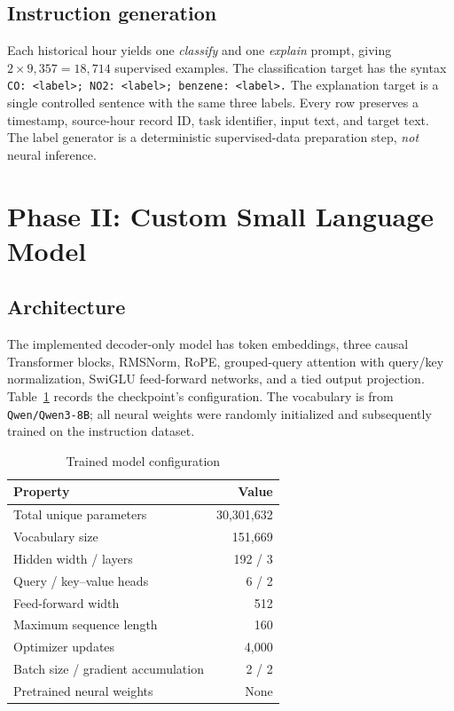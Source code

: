 \documentclass[conference,a4paper,10pt]{IEEEtran}
\begin{document}
\subsection{Instruction generation}
Each historical hour yields one \emph{classify} and one \emph{explain} prompt, giving $2\times9{,}357=18{,}714$ supervised examples. The classification target has the syntax \texttt{CO: <label>; NO2: <label>; benzene: <label>.} The explanation target is a single controlled sentence with the same three labels. Every row preserves a timestamp, source-hour record ID, task identifier, input text, and target text. The label generator is a deterministic supervised-data preparation step, \emph{not} neural inference.

\section{Phase II: Custom Small Language Model}
\subsection{Architecture}
The implemented decoder-only model has token embeddings, three causal Transformer blocks, RMSNorm, RoPE, grouped-query attention with query/key normalization, SwiGLU feed-forward networks, and a tied output projection. Table~\ref{tab:model} records the checkpoint's configuration. The vocabulary is from \texttt{Qwen/Qwen3-8B}; all neural weights were randomly initialized and subsequently trained on the instruction dataset.

\begin{table}[t]
\centering
\caption{Trained model configuration}
\label{tab:model}
\begin{tabular}{lr}
\toprule
Property & Value\\
\midrule
Total unique parameters & 30,301,632\\
Vocabulary size & 151,669\\
Hidden width / layers & 192 / 3\\
Query / key--value heads & 6 / 2\\
Feed-forward width & 512\\
Maximum sequence length & 160\\
Optimizer updates & 4,000\\
Batch size / gradient accumulation & 2 / 2\\
Pretrained neural weights & None\\
\bottomrule
\end{tabular}
\end{table}
\end{document}
